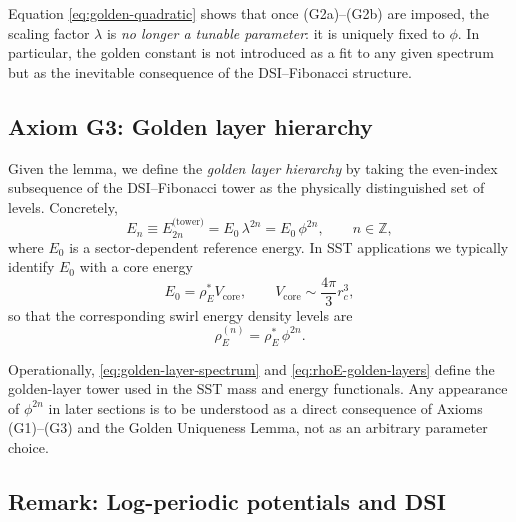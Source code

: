 \documentclass[10pt,reprint,aps,onecolumn,nofootinbib]{revtex4-2}
\newcommand{\rhoE}{\rho_{\!E}}                           %
\newcommand{\rc}{r_c}                                    %
\providecommand{\rc}{r_c}
\begin{document}
        \medskip

        Equation \eqref{eq:golden-quadratic} shows that once (G2a)--(G2b) are
        imposed, the scaling factor $\lambda$ is \emph{no longer a tunable
    parameter}: it is uniquely fixed to $\phi$. In particular, the golden
        constant is not introduced as a fit to any given spectrum but as the
        inevitable consequence of the DSI--Fibonacci structure.

    \subsection{Axiom G3: Golden layer hierarchy}

        Given the lemma, we define the \emph{golden layer hierarchy} by taking
        the even-index subsequence of the DSI--Fibonacci tower as the physically
        distinguished set of levels. Concretely,
        \begin{equation}
            E_n \equiv E_{2n}^{\text{(tower)}}
            = E_0\,\lambda^{2n}
            = E_0\,\phi^{2n},
            \qquad
            n\in\mathbb{Z},
            \label{eq:golden-layer-spectrum}
        \end{equation}
        where $E_0$ is a sector-dependent reference energy. In SST applications
        we typically identify $E_0$ with a core energy
        \begin{equation}
            E_0 = \rhoE^{*} V_{\text{core}},
            \qquad
            V_{\text{core}} \sim \frac{4\pi}{3}\rc^{3},
        \end{equation}
        so that the corresponding swirl energy density levels are
        \begin{equation}
            \rhoE^{(n)} = \rhoE^{*}\,\phi^{2n}.
            \label{eq:rhoE-golden-layers}
        \end{equation}

        Operationally, \eqref{eq:golden-layer-spectrum} and
        \eqref{eq:rhoE-golden-layers} define the golden-layer tower used in the
        SST mass and energy functionals. Any appearance of $\phi^{2n}$ in later
        sections is to be understood as a direct consequence of Axioms
        (G1)--(G3) and the Golden Uniqueness Lemma, not as an arbitrary
        parameter choice.

    \subsection{Remark: Log-periodic potentials and DSI}
\end{document}
